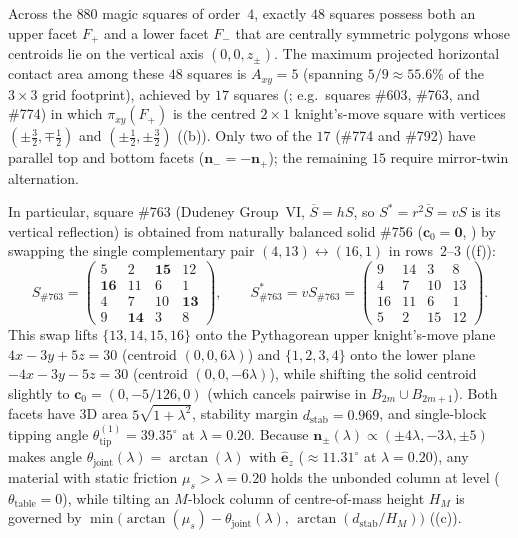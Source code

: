 \begin{proposition}
\label{prop:knights-move}
Across the $880$ magic squares of order~$4$, exactly $48$ squares possess both an upper facet $F_+$ and a lower facet $F_-$ that are centrally symmetric polygons whose centroids lie on the vertical axis $(0,0,z_\pm)$. The maximum projected horizontal contact area among these $48$ squares is $A_{xy}=5$ (spanning $5/9\approx55.6\%$ of the $3\times3$ grid footprint), achieved by $17$ squares (; e.g.\ squares \#603, \#763, and \#774) in which $\pi_{xy}(F_+)$ is the centred $2\times1$ knight's-move square with vertices $(\pm\frac32,\mp\frac12)$ and $(\pm\frac12,\pm\tfrac32)$ ((b)). Only two of the $17$ (\#774 and \#792) have parallel top and bottom facets ($\mathbf n_-=-\mathbf n_+$); the remaining $15$ require mirror-twin alternation.

In particular, square \#763 (Dudeney Group~VI, $\overline S=hS$, so $S^*=r^2\overline S=vS$ is its vertical reflection) is obtained from naturally balanced solid \#756 ($\mathbf c_0=\mathbf 0$, ) by swapping the single complementary pair $(4,13)\leftrightarrow(16,1)$ in rows~$2$--$3$ ((f)):
\[
S_{\#763} = \begin{pmatrix}
5 & 2 & \mathbf{15} & 12\\
\mathbf{16} & 11 & 6 & 1\\
4 & 7 & 10 & \mathbf{13}\\
9 & \mathbf{14} & 3 & 8
\end{pmatrix},\qquad
S^*_{\#763} = vS_{\#763} = \begin{pmatrix}
9 & 14 & 3 & 8\\
4 & 7 & 10 & 13\\
16 & 11 & 6 & 1\\
5 & 2 & 15 & 12
\end{pmatrix}.
\]
This swap lifts $\{13,14,15,16\}$ onto the Pythagorean upper knight's-move plane $4x-3y+5z=30$ (centroid $(0,0,6\lambda)$) and $\{1,2,3,4\}$ onto the lower plane $-4x-3y-5z=30$ (centroid $(0,0,-6\lambda)$), while shifting the solid centroid slightly to $\mathbf c_0=(0,-5/126,0)$ (which cancels pairwise in $B_{2m}\cup B_{2m+1}$). Both facets have 3D area $5\sqrt{1+\lambda^2}$, stability margin $d_{\mathrm{stab}}=0.969$, and single-block tipping angle $\theta_{\mathrm{tip}}^{(1)}=39.35^\circ$ at $\lambda=0.20$. Because $\mathbf n_\pm(\lambda)\propto(\pm4\lambda,-3\lambda,\pm5)$ makes angle $\theta_{\mathrm{joint}}(\lambda)=\arctan(\lambda)$ with $\hat{\mathbf e}_z$ ($\approx11.31^\circ$ at $\lambda=0.20$), any material with static friction $\mu_s>\lambda=0.20$ holds the unbonded column at level ($\theta_{\mathrm{table}}=0$), while tilting an $M$-block column of centre-of-mass height $H_M$ is governed by $\min\bigl(\arctan(\mu_s)-\theta_{\mathrm{joint}}(\lambda),\,\arctan(d_{\mathrm{stab}}/H_M)\bigr)$ ((c)).
\end{proposition}

